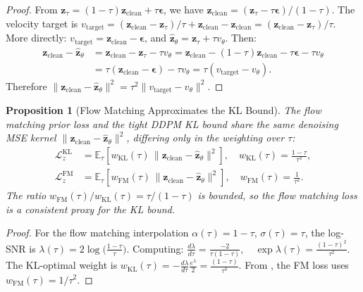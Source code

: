 \documentclass{article}
\newtheorem{proposition}{Proposition}
\newcommand{\vz}{\bm{z}}
\newcommand{\vep}{\bm{\epsilon}}
\newcommand{\E}{\mathbb{E}}
\newcommand{\KL}{\mathrm{KL}}
\newcommand{\loss}{\mathcal{L}}
\begin{document}
\begin{proof}
From $\vz_\tau = (1-\tau)\vz_{\text{clean}} + \tau\vep$, we have $\vz_{\text{clean}} = (\vz_\tau - \tau\vep)/(1-\tau)$. The velocity target is $v_{\text{target}} = (\vz_{\text{clean}} - \vz_\tau)/\tau + \vz_{\text{clean}} - \vz_{\text{clean}} = (\vz_{\text{clean}} - \vz_\tau)/\tau$.
More directly: $v_{\text{target}} = \vz_{\text{clean}} - \vep$, and $\hat{\vz}_\theta = \vz_\tau + \tau v_\theta$. Then:
\begin{align}
  \vz_{\text{clean}} - \hat{\vz}_\theta &= \vz_{\text{clean}} - \vz_\tau - \tau v_\theta = \vz_{\text{clean}} - (1-\tau)\vz_{\text{clean}} - \tau\vep - \tau v_\theta \nonumber \\
  &= \tau(\vz_{\text{clean}} - \vep) - \tau v_\theta = \tau(v_{\text{target}} - v_\theta).
\end{align}
Therefore $\|\vz_{\text{clean}} - \hat{\vz}_\theta\|^2 = \tau^2\|v_{\text{target}} - v_\theta\|^2$.
\end{proof}

\begin{proposition}[Flow Matching Approximates the KL Bound]
\label{prop:fm_kl}
The flow matching prior loss and the tight DDPM KL bound share the same denoising MSE kernel $\|\vz_{\text{clean}} - \hat{\vz}_\theta\|^2$, differing only in the weighting over $\tau$:
\begin{align}
  \loss_z^{\text{KL}} &= \E_\tau\!\left[w_{\KL}(\tau)\,\|\vz_{\text{clean}} - \hat{\vz}_\theta\|^2\right], \quad w_{\KL}(\tau) = \frac{1-\tau}{\tau^3}, \label{eq:ddpm_weight} \\
  \loss_z^{\text{FM}} &= \E_\tau\!\left[w_{\text{FM}}(\tau)\,\|\vz_{\text{clean}} - \hat{\vz}_\theta\|^2\right], \quad w_{\text{FM}}(\tau) = \frac{1}{\tau^2}. \label{eq:fm_weight}
\end{align}
The ratio $w_{\text{FM}}(\tau)/w_{\KL}(\tau) = \tau/(1-\tau)$ is bounded, so the flow matching loss is a consistent proxy for the KL bound.
\end{proposition}

\begin{proof}
For the flow matching interpolation $\alpha(\tau) = 1-\tau$, $\sigma(\tau) = \tau$, the log-SNR is $\lambda(\tau) = 2\log\!\big(\frac{1-\tau}{\tau}\big)$. Computing:
$\frac{d\lambda}{d\tau} = \frac{-2}{\tau(1-\tau)}, \quad \exp\lambda(\tau) = \frac{(1-\tau)^2}{\tau^2}.$
The KL-optimal weight is $w_{\KL}(\tau) = -\frac{d\lambda}{d\tau}\frac{e^\lambda}{2} = \frac{(1-\tau)}{\tau^3}$.
From , the FM loss uses $w_{\text{FM}}(\tau) = 1/\tau^2$.
\end{proof}
\end{document}
